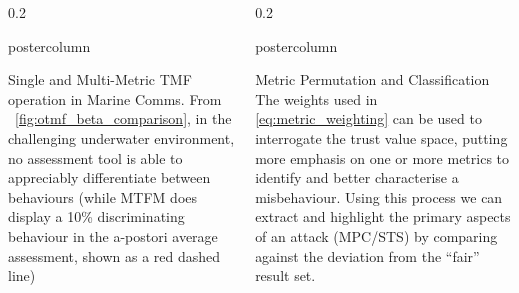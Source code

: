 \documentclass[final,hyperref={pdfpagelabels=false}]{beamer}
\def\colwidth{0.2\linewidth}
\begin{document}
\begin{frame}[fragile]
\begin{columns}[T]
\begin{column}{\colwidth}
\begin{beamercolorbox}[center,wd=\textwidth]{postercolumn}
\begin{minipage}[T]{.98\textwidth}
{\begin{block}{Single and Multi-Metric TMF operation in Marine Comms.}
							From ~\ref{fig:otmf_beta_comparison}, in the challenging underwater environment, no assessment tool is able to appreciably differentiate between behaviours (while MTFM does display a 10\% discriminating behaviour in the a-postori average assessment, shown as a red dashed line)
						\end{block}
						


						
					}
				\end{minipage}
			\end{beamercolorbox}
		\end{column}
				
		\begin{column}{\colwidth}
			\begin{beamercolorbox}[center,wd=\textwidth]{postercolumn}
				\begin{minipage}[T]{.98\textwidth} %
					\parbox[t]{\textwidth}{ %

						\begin{block}{Metric Permutation and Classification}
							The weights used in \eqref{eq:metric_weighting} can be used to interrogate the trust value space, putting more emphasis on one or more metrics to identify and better characterise a misbehaviour.
							Using this process we can extract and highlight the primary aspects of an attack (MPC/STS) by comparing against the deviation from the ``fair'' result set. 
							

\end{block}}
\end{minipage}
\end{beamercolorbox}
\end{column}
\end{columns}
\end{frame}
\end{document}
